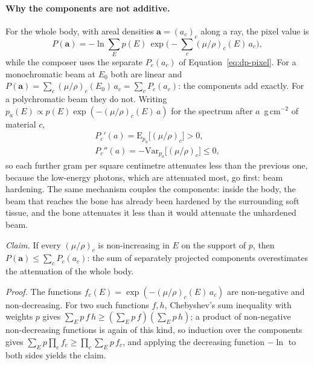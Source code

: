 \paragraph{Why the components are not additive.} For the whole body, with areal densities $\mathbf a=(a_c)_c$ along a ray, the pixel value is
\begin{equation}
  P(\mathbf a) = -\ln\sum_E p(E)\,\exp\!\Big(-\sum_c(\mu/\rho)_c(E)\,a_c\Big),
  \label{eq:dp-whole}
\end{equation}
while the composer uses the separate $P_c(a_c)$ of Equation~\eqref{eq:dp-pixel}. For a monochromatic beam at $E_0$ both are linear and
$P(\mathbf a)=\sum_c(\mu/\rho)_c(E_0)\,a_c=\sum_cP_c(a_c)$: the components add exactly. For a polychromatic beam they do not. Writing
$p_a(E)\propto p(E)\exp(-(\mu/\rho)_c(E)\,a)$ for the spectrum after $a$~g\,cm$^{-2}$ of material $c$,
\begin{equation}
\begin{gathered}
P_c'(a)=\mathrm{E}_{p_a}\big[(\mu/\rho)_c\big]>0,\\
P_c''(a)=-\mathrm{Var}_{p_a}\big[(\mu/\rho)_c\big]\le0 ,
\end{gathered}
\label{eq:dp-concave}
\end{equation}
so each further gram per square centimetre attenuates less than the previous one, because the low-energy photons, which are attenuated most, go
first: beam hardening. The same mechanism couples the components: inside the body, the beam that reaches the bone has already been hardened by
the surrounding soft tissue, and the bone attenuates it less than it would attenuate the unhardened beam.

\emph{Claim.} If every $(\mu/\rho)_c$ is non-increasing in $E$ on the support of $p$, then $P(\mathbf a)\le\sum_cP_c(a_c)$: the sum of separately
projected components overestimates the attenuation of the whole body.

\emph{Proof.} The functions $f_c(E)=\exp(-(\mu/\rho)_c(E)\,a_c)$ are non-negative and non-decreasing. For two such functions $f,h$, Chebyshev's sum
inequality with weights $p$ gives $\sum_Ep\,f\,h\ge(\sum_Ep\,f)(\sum_Ep\,h)$; a product of non-negative non-decreasing functions is again of this
kind, so induction over the components gives $\sum_Ep\prod_cf_c\ge\prod_c\sum_Ep\,f_c$, and applying the decreasing function $-\ln$ to both sides
yields the claim.

